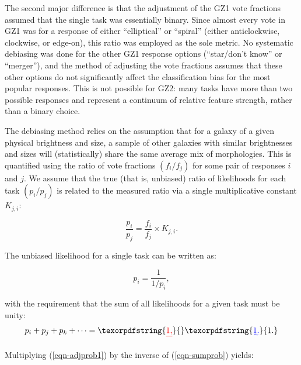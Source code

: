\documentclass[useAMS,usenatbib]{mn2e}
\providecommand{\DIFaddtex}[1]{{\protect\color{blue}\uwave{#1}}} %
\providecommand{\DIFdeltex}[1]{{\protect\color{red}\sout{#1}}}                      %
\providecommand{\DIFaddbegin}{} %
\providecommand{\DIFaddend}{} %
\providecommand{\DIFdelbegin}{} %
\providecommand{\DIFdelend}{} %
\providecommand{\DIFadd}[1]{\texorpdfstring{\DIFaddtex{#1}}{#1}} %
\providecommand{\DIFdel}[1]{\texorpdfstring{\DIFdeltex{#1}}{}} %
\begin{document}
The second major difference is that the adjustment of the GZ1 vote fractions assumed that the single task was essentially binary. Since almost every vote in GZ1 was for a response of either ``elliptical'' or ``spiral'' (either anticlockwise, clockwise, or edge-on), this ratio was employed as the sole metric. No systematic debiasing was done for the other GZ1 response options (``star/don't know'' or ``merger''), and the method of adjusting the vote fractions assumes that these other options do not significantly affect the classification bias for the most popular responses. This is not possible for GZ2: many tasks have more than two possible responses and represent a continuum of relative feature strength, rather than a binary choice.

The debiasing method relies on the assumption that for a galaxy of a given physical brightness and size, a sample of other galaxies with similar brightnesses and sizes will (statistically) share the same average mix of morphologies. This is quantified using the ratio of vote fractions $(f_i/f_j)$ for some pair of responses $i$ and $j$. We assume that the true (that is, unbiased) ratio of likelihoods for each task $(p_i/p_j)$ is related to the measured ratio via a single multiplicative constant $K_{j,i}$:
\DIFdelbegin %

\DIFdelend \begin{equation}
\frac{p_i}{p_j} = \frac{f_i}{f_j}\times K_{j,i}.
\label{eqn-kdef}
\end{equation}

\DIFdelbegin %
\DIFdelend The unbiased likelihood for a single task can be written as:
\DIFdelbegin %

\DIFdelend \begin{equation}
p_i = \frac{1}{1/p_i},
\label{eqn-adjprob1}
\end{equation}
\DIFdelbegin %

\DIFdelend with the requirement that the sum of all likelihoods for a given task must be unity:
\begin{equation}
p_i + p_j + p_k + \dots = \DIFdelbegin \DIFdel{1,
}\DIFdelend \DIFaddbegin \DIFadd{1.
}\DIFaddend \label{eqn-sumprob}
\end{equation}

\DIFdelbegin %
\DIFdelend Multiplying (\ref{eqn-adjprob1}) by the inverse of (\ref{eqn-sumprob}) yields:
\DIFdelbegin %
\end{document}
